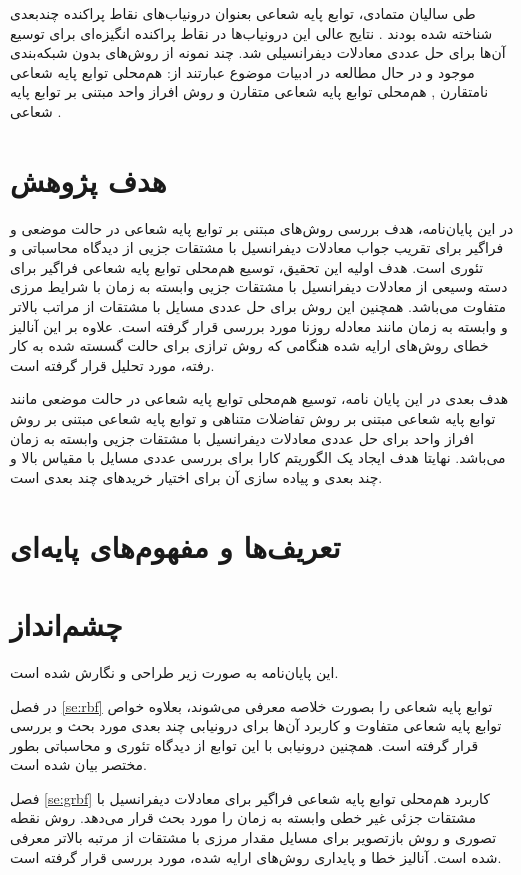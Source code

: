طی سالیان متمادی، توابع پایه شعاعی بعنوان درونیاب‌های نقاط پراکنده چند‌بعدی شناخته شده بودند
\citep{Wendland}.
نتایج عالی این درونیاب‌ها در نقاط پراکنده انگیزه‌ای برای توسیع آن‌ها برای حل عددی معادلات دیفرانسیلی شد. چند نمونه از روش‌های بدون شبکه‌بندی موجود و در حال مطالعه در ادبیات موضوع عبارتند از: هم‌محلی توابع پایه شعاعی نامتقارن
\citep{Larsson},
هم‌محلی توابع پایه شعاعی متقارن
\citep{Rieger,Hon}
و روش افراز واحد مبتنی بر توابع پایه شعاعی
\citep{McLain}.


\section{هدف پژوهش}
در این پایان‌نامه، هدف بررسی روش‌های مبتنی بر توابع پایه شعاعی در حالت موضعی و فراگیر برای تقریب جواب معادلات دیفرانسیل با مشتقات جزیی از دیدگاه محاسباتی و تئوری است. هدف اولیه این تحقیق، توسیع هم‌محلی توابع پایه شعاعی فراگیر برای دسته وسیعی از معادلات دیفرانسیل با مشتقات جزیی وابسته به زمان با شرایط مرزی متفاوت می‌باشد. همچنین این روش برای حل عددی مسایل با مشتقات از مراتب بالاتر و وابسته به زمان مانند معادله روزنا 
مورد بررسی قرار گرفته است. علاوه بر این آنالیز خطای روش‌های ارایه شده  هنگامی که روش‌ ترازی
برای حالت گسسته شده به کار رفته، مورد تحلیل قرار گرفته است.

هدف بعدی در این پایان نامه،  توسیع هم‌محلی توابع پایه شعاعی در حالت موضعی مانند توابع پایه شعاعی مبتنی بر روش تفاضلات متناهی و توابع پایه شعاعی مبتنی بر روش افراز واحد برای حل عددی معادلات دیفرانسیل با مشتقات جزیی وابسته به زمان می‌باشد. نهایتا هدف ایجاد یک الگوریتم کارا برای بررسی عددی مسایل با مقیاس بالا و چند بعدی و پیاده سازی آن برای اختیار خریدهای چند بعدی است.
\section{تعریف‌ها و مفهوم‌های پایه‌ای}
\section{چشم‌انداز} 
این پایان‌نامه به صورت زیر طراحی و نگارش شده است.

در فصل
\ref{se:rbf}
توابع پایه شعاعی را بصورت خلاصه معرفی می‌شوند، بعلاوه خواص توابع پایه شعاعی متفاوت و کاربرد آن‌ها برای درونیابی چند بعدی مورد بحث و بررسی قرار گرفته است. همچنین درونیابی با این توابع از دیدگاه تئوری و محاسباتی بطور مختصر بیان شده است.

فصل
\ref{se:grbf}
کاربرد هم‌محلی توابع پایه شعاعی فراگیر برای معادلات دیفرانسیل با مشتقات جزئی  غیر خطی وابسته به زمان را مورد بحث قرار می‌دهد. روش نقطه تصوری
و روش بازتصویر
برای مسایل مقدار مرزی با مشتقات از مرتبه بالاتر معرفی شده است. آنالیز خطا و پایداری روش‌های ارایه شده، مورد بررسی قرار گرفته است.


